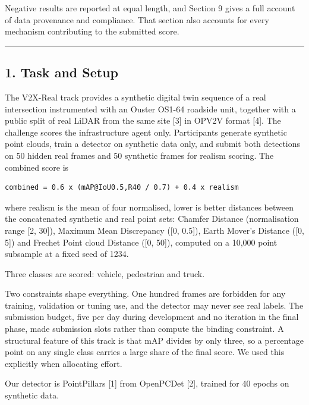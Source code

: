\documentclass[
  10pt,
]{article}
\begin{document}
Negative results are reported at equal length, and Section 9 gives a
full account of data provenance and compliance. That section also
accounts for every mechanism contributing to the submitted score.

\begin{center}\rule{0.5\linewidth}{0.5pt}\end{center}

\subsection{1. Task and Setup}\label{task-and-setup}

The V2X-Real track provides a synthetic digital twin sequence of a real
intersection instrumented with an Ouster OS1-64 roadside unit, together
with a public split of real LiDAR from the same site {[}3{]} in OPV2V
format {[}4{]}. The challenge scores the infrastructure agent only.
Participants generate synthetic point clouds, train a detector on
synthetic data only, and submit both detections on 50 hidden real frames
and 50 synthetic frames for realism scoring. The combined score is

\begin{verbatim}
combined = 0.6 x (mAP@IoU0.5,R40 / 0.7) + 0.4 x realism
\end{verbatim}

where realism is the mean of four normalised, lower is better distances
between the concatenated synthetic and real point sets: Chamfer Distance
(normalisation range {[}2, 30{]}), Maximum Mean Discrepancy ({[}0,
0.5{]}), Earth Mover's Distance ({[}0, 5{]}) and Frechet Point cloud
Distance ({[}0, 50{]}), computed on a 10,000 point subsample at a fixed
seed of 1234.

Three classes are scored: vehicle, pedestrian and truck.

Two constraints shape everything. One hundred frames are forbidden for
any training, validation or tuning use, and the detector may never see
real labels. The submission budget, five per day during development and
no iteration in the final phase, made submission slots rather than
compute the binding constraint. A structural feature of this track is
that mAP divides by only three, so a percentage point on any single
class carries a large share of the final score. We used this explicitly
when allocating effort.

Our detector is PointPillars {[}1{]} from OpenPCDet {[}2{]}, trained for
40 epochs on synthetic data.
\end{document}
